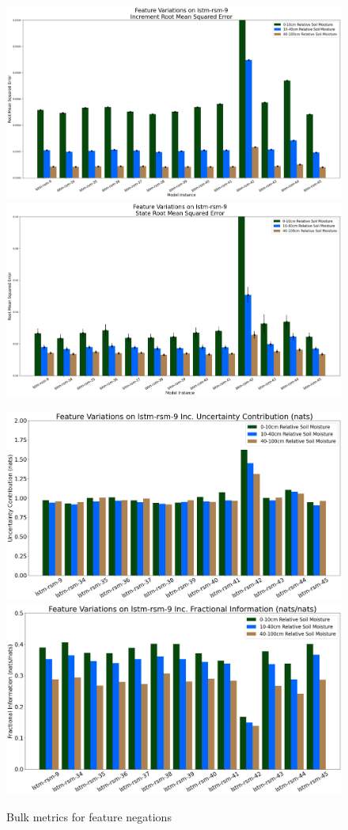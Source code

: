 \begin{figure}[hp!]
    \includegraphics[width=.48\linewidth,draft=false]{figures/efficiency_variations/eval_test_efficiency_variations-feat-lstm-rsm-9_mse_res.png}
    \includegraphics[width=.48\linewidth,draft=false]{figures/efficiency_variations/eval_test_efficiency_variations-feat-lstm-rsm-9_mse_state.png}

    \includegraphics[width=.48\linewidth,draft=false]{figures/efficiency_variations/eval_test_efficiency_variations-feat-lstm-rsm-9_info-loss_res.png}
    \includegraphics[width=.48\linewidth,draft=false]{figures/efficiency_variations/eval_test_efficiency_variations-feat-lstm-rsm-9_fi_res.png}

    \caption{Bulk metrics for feature negations}
    \label{feat-variants}
\end{figure}

